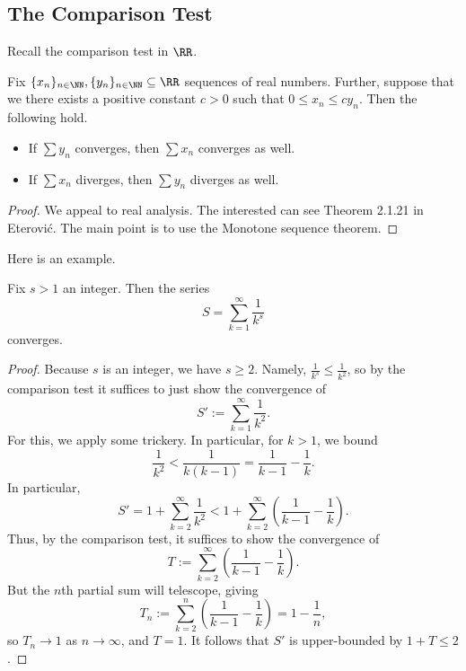 \subsection{The Comparison Test}
Recall the comparison test in $\RR$.
\begin{theorem}
	Fix $\{x_n\}_{n\in\NN},\{y_n\}_{n\in\NN}\subseteq\RR$ sequences of real numbers. Further, suppose that we there exists a positive constant $c>0$ such that $0\le x_n\le cy_n$. Then the following hold.
	\begin{itemize}
		\item If $\sum y_n$ converges, then $\sum x_n$ converges as well.
		\item If $\sum x_n$ diverges, then $\sum y_n$ diverges as well.
	\end{itemize}
\end{theorem}
\begin{proof}
	We appeal to real analysis. The interested can see Theorem 2.1.21 in Eterovi\'c. The main point is to use the Monotone sequence theorem.
\end{proof}
Here is an example.
\begin{exe}
	Fix $s>1$ an integer. Then the series
	\[S=\sum_{k=1}^\infty\frac1{k^s}\]
	converges.
\end{exe}
\begin{proof}
	Because $s$ is an integer, we have $s\ge2$. Namely, $\frac1{k^s}\le\frac1{k^2}$, so by the comparison test it suffices to just show the convergence of
	\[S':=\sum_{k=1}^\infty\frac1{k^2}.\]
	For this, we apply some trickery. In particular, for $k>1$, we bound
	\[\frac1{k^2}<\frac1{k(k-1)}=\frac1{k-1}-\frac1k.\]
	In particular,
	\[S'=1+\sum_{k=2}^\infty\frac1{k^2}<1+\sum_{k=2}^\infty\left(\frac1{k-1}-\frac1k\right).\]
	Thus, by the comparison test, it suffices to show the convergence of
	\[T:=\sum_{k=2}^\infty\left(\frac1{k-1}-\frac1k\right).\]
	But the $n$th partial sum will telescope, giving
	\[T_n:=\sum_{k=2}^n\left(\frac1{k-1}-\frac1k\right)=1-\frac1n,\]
	so $T_n\to1$ as $n\to\infty$, and $T=1$. It follows that $S'$ is upper-bounded by $1+T\le2$.
\end{proof}

